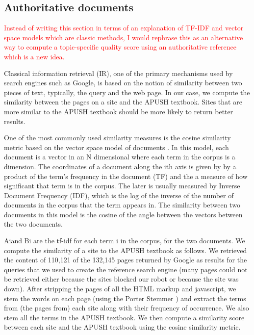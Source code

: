 \documentclass{acm_proc_article-sp}
\begin{document}
\subsection{Authoritative documents}

\textcolor{red}{Instead of writing this section in terms of an explanation of
  TF-IDF and vector space models which are classic methods, I would rephrase this
  as an alternative way to compute a topic-specific quality score using an
  authoritative reference which is a new idea.}

Classical information retrieval (IR), one of the primary mechanisms used by
search engines such as Google, is based on the notion of similarity between two
pieces of text, typically, the query and the web page.  In our case, we compute
the similarity between the pages on a site and the APUSH textbook. Sites that
are more similar to the APUSH textbook should  be more likely to return better
results. 

One of the most commonly used similarity measures is the cosine similarity
metric based on the vector space model of documents \cite{salton1975vector}. In
this model, each document is a vector in an N dimensional where each term in the
corpus is a dimension. The coordinates of a document along the ith axis is given by by a
product of the term's frequency in the document (TF) and the a measure of how
significant that term is in the corpus. The later is usually measured by Inverse
Document Frequency (IDF), which is the log of the inverse of the number of
documents in the corpus that the term appears in. The similarity between two
documents in this model is the cosine of the angle between the vectors between
the two documents. 

Aiand Bi are the tf-idf for each term i in the corpus, for the two documents. We
compute the similarity of a site to the APUSH textbook as follows. We retrieved
the content of 110,121 of the 132,145 pages returned by Google as results for
the queries that we used to create the reference search engine (many pages could
not be retrieved either because the sites blocked our robot or because the site
was down). After stripping the pages of all the HTML markup and javascript, we
stem the words on each page (using the Porter Stemmer
\cite{porter1980algorithm}) and extract the terms from (the pages from) each
site along with their frequency of occurrence. We also stem all the terms in the
APUSH textbook. We then compute a similarity score between each site and the
APUSH textbook using the cosine similarity metric.
\end{document}
